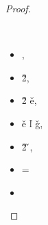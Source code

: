 \begin{lemma}
\begin{proof}
\begin{case}[B-Delta]
\begin{itemize}
\begin{subcase}[T-App]
\begin{itemize}
  \end{itemize}

\end{subcase}
\end{itemize}
\end{case}

\begin{case}[B-BetaMulti]
  \ 

  \begin{itemize}
    \item
  \opsem {\openv{}}
         {}
         { {\disptable{}}},
    \item
  \opsem {\openv{}}
         {}
         {\v{2}},
    \item
  \opsem {\openv{}}
         { {\v{2}}}
         {\v{e}},
    \item
  \getmethod {\disptable{}}
             {\v{e}}
             {\v{l}}
             {\v{g}},
    \item
  \opsem {\openv{}}
         { {\v{2}}}
         {\v{}},
       \item {\disptable{}} = {}
     \end{itemize}
     \begin{itemize}
       \item[]
\begin{subcase}[T-App]
  \ 


\end{subcase}
\end{itemize}
\end{case}
\end{proof}
\end{lemma}
